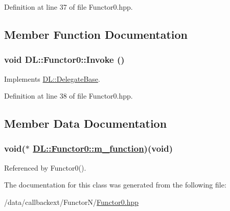 Definition at line 37 of file Functor0.hpp.

\subsection{Member Function Documentation}
\hypertarget{classDL_1_1Functor0_a2}{
\subsubsection[Invoke]{\setlength{\rightskip}{0pt plus 5cm}void DL::Functor0::Invoke ()}}
\label{classDL_1_1Functor0_a2}




Implements \hyperlink{classDL_1_1DelegateBase_a2}{DL::Delegate\-Base}.

Definition at line 38 of file Functor0.hpp.

\subsection{Member Data Documentation}
\hypertarget{classDL_1_1Functor0_r0}{
\subsubsection[m\_\-function]{\setlength{\rightskip}{0pt plus 5cm}void($\ast$ \hyperlink{classDL_1_1Functor0_r0}{DL::Functor0::m\_\-function})(void)}}
\label{classDL_1_1Functor0_r0}




Referenced by Functor0().

The documentation for this class was generated from the following file:\begin{CompactItemize}
\item 
/data/callbackext/Functor\-N/\hyperlink{Functor0_8hpp}{Functor0.hpp}\end{CompactItemize}

